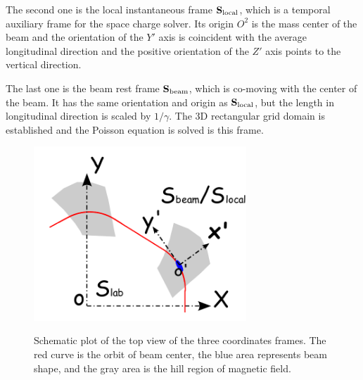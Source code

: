 \documentclass[aps,prstab,twocolumn,superscriptaddress]{revtex4}
\newcommand{\bs}[1]{\mathbf #1}
\begin{document}
The second one is the local instantaneous frame ${\bs{S}_{\RM{local}}}$, which is a temporal auxiliary frame for the space charge solver.
Its origin $O^2$ is the mass center of the beam and the orientation of the $Y'$ axis is coincident with the average longitudinal direction and 
the positive orientation of the $Z'$ axis points to the vertical direction.

The last one is the beam rest frame $\bs{S}_{\RM{beam}}$, which is co-moving with the center of the beam. 
It has the same orientation and origin as ${\bs{S}_{\RM{local}}}$, but the length in longitudinal 
direction is scaled by $1/\gamma$. 
The 3D rectangular grid domain is established and the Poisson equation is solved is this frame.
  \begin{figure}
    {\includegraphics[width=8cm]{figures/SM-frame.pdf}}
    \caption{Schematic plot of the top view of the three coordinates frames. The red curve is the orbit of beam center, 
      the blue area represents beam shape, and the gray area is the hill region of magnetic field.}
    \label{fig:frame}
  \end{figure}
\end{document}
